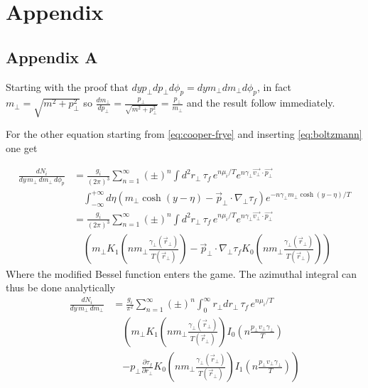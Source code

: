 \documentclass[12pt,a4paper]{book}
\begin{document}
	\chapter{Appendix}
	\appendix
	\renewcommand{\thesection}{\Alph{section}}
	\section{Appendix A} \label{app:A}
	Starting with the proof that $dy p_\perp dp_\perp d\phi_p = dy m_\perp dm_\perp d\phi_p$, in fact $m_\perp=\sqrt{m^2 + p_\perp^2}$ so $\frac{dm_\perp}{dp_\perp}= \frac{p_\perp}{\sqrt{m^2 + p_\perp^2}} = \frac{p_\perp}{m_\perp}$ and the result follow immediately.
	
	For the other equation starting from \ref{eq:cooper-frye} and inserting \ref{eq:boltzmann} one get
	
	\begin{equation}
		\begin{aligned}
			\frac{d N_i}{dy\, m_\perp\, dm_\perp\, d\phi_p} &= \frac{g_i}{(2\pi)^3} \sum_{n=1}^{\infty} (\pm)^n \int d^2 r_\perp \, \tau_f \, e^{n\mu_i/T} e^{n\gamma_\perp \vec{v_\perp} \cdot \vec{p_\perp}} \\
			& \quad \int_{-\infty}^{+\infty} d\eta \left(m_\perp \cosh(y-\eta) - \vec{p}_\perp \cdot \nabla_\perp \tau_f \right) e^{-n \gamma_\perp m_\perp \cosh(y-\eta)/T} \\
			&= \frac{g_i}{(2\pi)^3} \sum_{n=1}^{\infty} (\pm)^n \int d^2 r_\perp \, \tau_f \, e^{n\mu_i/T} e^{n\gamma_\perp \vec{v_\perp} \cdot \vec{p_\perp}} \\
			& \quad \left( m_\perp K_1\left(n m_\perp \frac{\gamma_\perp(\vec{r}_\perp)}{T(\vec{r}_\perp)}\right) - \vec{p}_\perp \cdot \nabla_\perp \tau_f K_0\left(n m_\perp \frac{\gamma_\perp(\vec{r}_\perp)}{T(\vec{r}_\perp)}\right) \right)
		\end{aligned}
	\end{equation}
	Where the modified Bessel function enters the game. The azimuthal integral can thus be done analytically
	\begin{equation}
		\begin{aligned}
			\frac{d N_i}{dy\, m_\perp\, dm_\perp} &= \frac{g_i}{\pi^2} \sum_{n=1}^{\infty} (\pm)^n \int_{0}^{\infty} r_\perp dr_\perp \, \tau_f \, e^{n\mu_i/T} \\
			& \quad \left( m_\perp K_1\left(n m_\perp \frac{\gamma_\perp(\vec{r}_\perp)}{T(\vec{r}_\perp)}\right) I_0\left(n \frac{p_\perp v_\perp \gamma_\perp}{T}\right) \right. \\
			& \quad \left. - p_\perp \frac{\partial \tau_f}{\partial r_\perp} K_0\left(n m_\perp \frac{\gamma_\perp(\vec{r}_\perp)}{T(\vec{r}_\perp)}\right) I_1\left(n \frac{p_\perp v_\perp \gamma_\perp}{T}\right) \right)
		\end{aligned}
	\end{equation}
	
\end{document}
